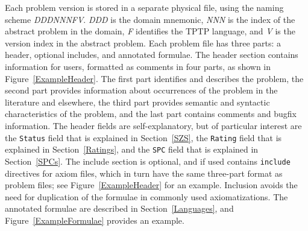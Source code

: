 \documentclass[runningheads]{llncs}
\begin{document}
Each problem version is stored in a separate physical file, using the naming scheme {\em DDDNNNFV}.
{\em DDD} is the domain mnemonic, {\em NNN} is the index of the abstract problem in the domain,
{\em F} identifies the TPTP language, and {\em V} is the version index in the abstract problem.
Each problem file has three parts: a header, optional includes, and annotated formulae.
The header section contains information for users, formatted as comments in four parts, as shown
in Figure~\ref{ExampleHeader}.
The first part identifies and describes the problem,
the second part provides information about occurrences of the problem
in the literature and elsewhere,
the third part provides semantic and syntactic characteristics of the problem, and
the last part contains comments and bugfix information.
The header fields are self-explanatory, but of particular interest are the {\tt Status} field 
that is explained in Section~\ref{SZS}, the {\tt Rating} field that is explained in 
Section~\ref{Ratings}, and the {\tt SPC} field that is explained in Section~\ref{SPCs}.
The include section is optional, and if used contains {\tt include} directives for axiom files,
which in turn have the same three-part format as problem files; see Figure~\ref{ExampleHeader}
for an example.
Inclusion avoids the need for duplication of the formulae in commonly used axiomatizations.
The annotated formulae are described in Section~\ref{Languages}, and Figure~\ref{ExampleFormulae} 
provides an example.
\end{document}
